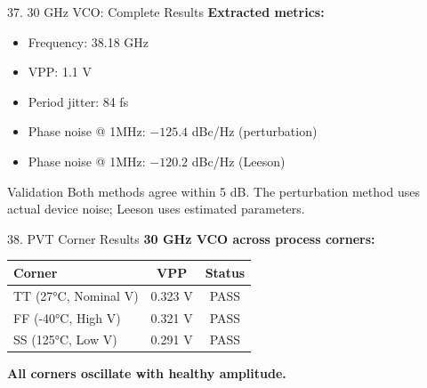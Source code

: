 \documentclass[aspectratio=169, 11pt]{beamer}
\begin{document}
\begin{frame}{37. 30 GHz VCO: Complete Results}
    \textbf{Extracted metrics:}

    \vspace{0.5em}
    \begin{itemize}
        \item Frequency: 38.18 GHz
        \item VPP: 1.1 V
        \item Period jitter: 84 fs
        \item Phase noise @ 1MHz: $-125.4$ dBc/Hz (perturbation)
        \item Phase noise @ 1MHz: $-120.2$ dBc/Hz (Leeson)
    \end{itemize}

    \vspace{0.5em}
    \begin{block}{Validation}
        Both methods agree within 5 dB. The perturbation method uses actual device noise; Leeson uses estimated parameters.
    \end{block}
\end{frame}

\begin{frame}{38. PVT Corner Results}
    \textbf{30 GHz VCO across process corners:}

    \vspace{0.5em}
    \begin{center}
        \begin{tabular}{lcc}
            \toprule
            Corner & VPP & Status \\
            \midrule
            TT (27°C, Nominal V) & 0.323 V & PASS \\
            FF (-40°C, High V) & 0.321 V & PASS \\
            SS (125°C, Low V) & 0.291 V & PASS \\
            \bottomrule
        \end{tabular}
    \end{center}

    \vspace{0.5em}
    \textbf{All corners oscillate with healthy amplitude.}
\end{frame}
\end{document}
